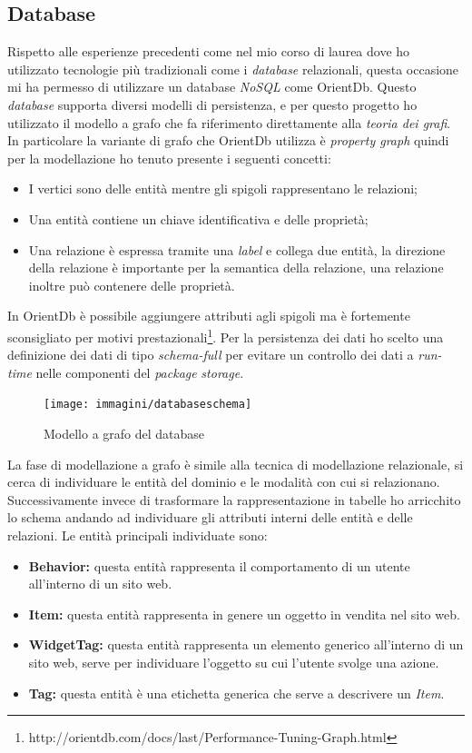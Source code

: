 \subsection{Database}
Rispetto alle esperienze precedenti come nel mio corso di laurea dove ho utilizzato tecnologie più tradizionali come i \emph{database} relazionali, questa occasione mi ha permesso di utilizzare un database \emph{NoSQL} come OrientDb. Questo \emph{database} supporta diversi modelli di persistenza, e per questo progetto ho utilizzato il modello a grafo che fa riferimento direttamente alla \emph{teoria dei grafi}. In particolare la variante di grafo che OrientDb utilizza è \emph{property graph} quindi per la modellazione ho tenuto presente i seguenti concetti:
\begin{itemize}
\item I vertici sono delle entità mentre gli spigoli rappresentano le relazioni;
\item Una entità contiene un chiave identificativa e delle proprietà; 
\item Una relazione è espressa tramite una \emph{label} e collega due entità, la direzione della relazione è importante per la semantica della relazione, una relazione inoltre può contenere delle proprietà.
\end{itemize}
In OrientDb è possibile aggiungere attributi agli spigoli ma è fortemente sconsigliato per motivi prestazionali\footnote{http://orientdb.com/docs/last/Performance-Tuning-Graph.html}. Per la persistenza dei dati ho scelto una definizione dei dati di tipo \emph{schema-full} per evitare un controllo dei dati a \emph{run-time} nelle componenti del \emph{package} \emph{storage}.
\newpage
\begin{figure}[h]
\centering
\texttt{[image: immagini/databaseschema]}
\caption{Modello a grafo del database}
\label{fig:database-schema}
\end{figure}
La fase di modellazione a grafo è simile alla tecnica di modellazione relazionale, si cerca di individuare le entità del dominio e le modalità con cui si relazionano. Successivamente invece di trasformare la rappresentazione in tabelle ho arricchito lo schema andando ad individuare gli attributi interni delle entità e delle relazioni.
Le entità principali individuate sono:
\begin{itemize}
\item \textbf{Behavior:} questa entità rappresenta il comportamento di un utente all'interno di un sito web.
\item \textbf{Item:} questa entità rappresenta in genere un oggetto in vendita nel sito web.
\item \textbf{WidgetTag:} questa entità rappresenta un elemento generico all'interno di un sito web, serve per individuare l'oggetto su cui l'utente svolge una azione. %
\item \textbf{Tag:} questa entità è una etichetta generica che serve a descrivere un \emph{Item}.
\end{itemize}
